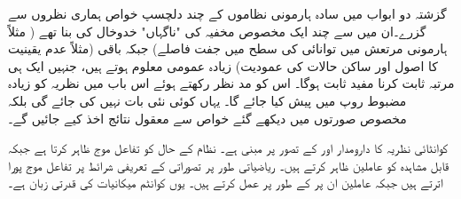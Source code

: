 
گزشتہ دو ابواب میں سادہ ہارمونی نظاموں کے چند دلچسپ خواص ہماری نظروں سے گزرے۔ان میں سے چند ایک مخصوص مخفیہ کی "ناگہاں" خدوخال کی بنا تھے ( مثلاً ہارمونی مرتعش میں توانائی کی سطح میں جفت فاصلے) جبکہ باقی (مثلاً عدم یقینیت کا اصول اور ساکن حالات کی عمودیت) زیادہ عمومی معلوم ہوتے ہیں، جنہیں ایک ہی مرتبہ ثابت کرنا مفید ثابت ہوگا۔ اس کو مد نظر رکھتے ہوئے اس باب میں نظریہ کو زیادہ مضبوط روپ میں پیش کیا جائے گا۔ یہاں کوئی نئی بات نہیں کی جائے گی بلکہ مخصوص صورتوں میں دیکھے گئے خواص سے معقول نتائج اخذ کیے جائیں گے۔
	
کوانٹائی نظریہ کا دارومدار اور  کے تصور پر مبنی ہے۔ نظام کے حال کو تفاعل موج ظاہر کرتا ہے جبکہ قابل مشاہدہ کو عاملین ظاہر کرتے ہیں۔ ریاضیاتی طور پر تصوراتی  کے تعریفی شرائط پر تفاعل موج پورا اترتے ہیں جبکہ عاملین ان پر  کے طور پر عمل کرتے ہیں۔ یوں کوانٹم میکانیات کی قدرتی زبان  ہے۔
	
